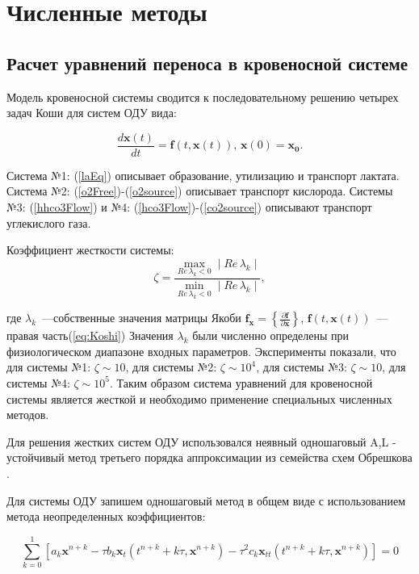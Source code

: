 \section{Численные методы}
\label{sec:bloodNumeric}

\subsection{Расчет уравнений переноса в кровеносной системе}
Модель кровеносной системы сводится к последовательному решению четырех задач Коши для систем ОДУ вида:

\begin{equation} \label{eq:Koshi}
\frac{d\mathbf{x}(t)}{dt}=\mathbf{f}(t,\mathbf{x}(t)), \, \mathbf{x}(0)=\mathbf{x_0}.
\end{equation}

Система №1: (\ref{laEq}) описывает образование, утилизацию и транспорт лактата.  Система №2: (\ref{o2Free})-(\ref{o2source}) описывает транспорт кислорода. Системы №3: (\ref{hhco3Flow}) и №4: (\ref{hco3Flow})-(\ref{co2source}) описывают транспорт углекислого газа.

Коэффициент жесткости системы:
\begin{equation}
    \zeta = \frac{\max \limits_{Re \, \lambda_k < 0} \mid Re \, \lambda_k \mid}{\min \limits_{Re \, \lambda_k < 0} \mid Re \, \lambda_k \mid},
\end{equation}

где $\lambda_k$~---собственные значения матрицы Якоби $\displaystyle \mathbf{f}_\mathbf{x} = \left\{ \frac{\partial \mathbf{f}}{\partial \mathbf{x}} \right\}$, $\mathbf{f}(t,\mathbf{x}(t))$~--- правая часть(\ref{eq:Koshi})
Значения $\lambda_k$ были численно определены при физиологическом диапазоне входных параметров. Эксперименты показали, что для системы №1: \(\zeta \sim 10\), для системы №2: \(\zeta \sim 10^{4}\), для системы №3: \(\zeta \sim 10\), для системы №4: \(\zeta \sim 10^{5}\). Таким образом система уравнений для кровеносной системы является жесткой и необходимо применение специальных численных методов.

Для решения жестких систем ОДУ использовался неявный одношаговый A,L - устойчивый метод третьего порядка аппроксимации из семейства схем Обрешкова \cite{Hairer1999}.

Для системы ОДУ запишем одношаговый метод в общем виде с использованием метода неопределенных коэффициентов:

\begin{equation}
\sum_{k=0}^{1}\left[a_{k}\mathbf{x}^{n+k}-\tau b_{k}\mathbf{x}_{t}\left(t^{n+k}+k\tau, \mathbf{x}^{n+k}\right)-\tau^{2}c_{k}\mathbf{x}_{tt}\left(t^{n+k}+k\tau,\mathbf{x}^{n+k}\right)\right]=0
\end{equation}

